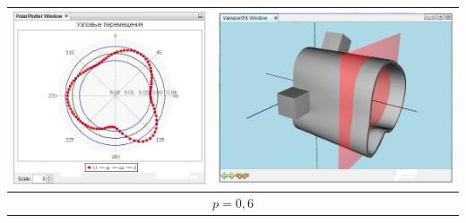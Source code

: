\documentclass[14pt,oneside,final]{extreport}
\begin{document}
\begin{table}[]
{{\begin{tabu}[]{|c|c|}
					\includegraphics[scale=0.55]{img/plane-position-test2} & \includegraphics[scale=0.55]{img/plane-position-test2-model}  \\ 
					\hline
					 \\ \hline

\end{tabu}}}
\end{table}
\end{document}
